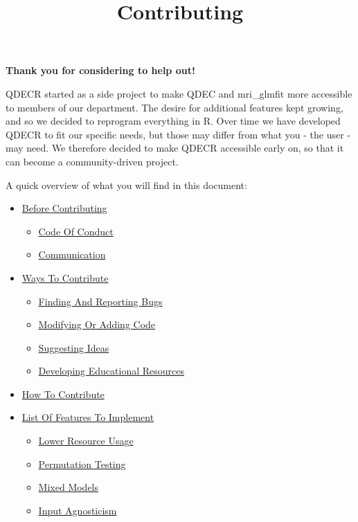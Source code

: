 \documentclass[]{article}
\title{Contributing}
\author{}
\date{}
\providecommand{\tightlist}{%
  \setlength{\itemsep}{0pt}\setlength{\parskip}{0pt}}
\begin{document}
\maketitle

\textbf{Thank you for considering to help out!}

QDECR started as a side project to make QDEC and mri\_glmfit more
accessible to members of our department. The desire for additional
features kept growing, and so we decided to reprogram everything in R.
Over time we have developed QDECR to fit our specific needs, but those
may differ from what you - the user - may need. We therefore decided to
make QDECR accessible early on, so that it can become a community-driven
project.

A quick overview of what you will find in this document:

\begin{itemize}
\tightlist
\item
  \protect\hyperlink{before-contributing}{Before Contributing}

  \begin{itemize}
  \tightlist
  \item
    \protect\hyperlink{code-of-conduct}{Code Of Conduct}
  \item
    \protect\hyperlink{communication}{Communication}
  \end{itemize}
\item
  \protect\hyperlink{ways-to-contribute}{Ways To Contribute}

  \begin{itemize}
  \tightlist
  \item
    \protect\hyperlink{finding-and-reporting-bugs}{Finding And Reporting
    Bugs}
  \item
    \protect\hyperlink{modifying-or-adding-code}{Modifying Or Adding
    Code}
  \item
    \protect\hyperlink{suggesting-ideas}{Suggesting Ideas}
  \item
    \protect\hyperlink{developing-educationalux5cux2520resources}{Developing
    Educational Resources}
  \end{itemize}
\item
  \protect\hyperlink{how-to-contribute}{How To Contribute}
\item
  \protect\hyperlink{list-of-features-to-implement}{List Of Features To
  Implement}

  \begin{itemize}
  \tightlist
  \item
    \protect\hyperlink{lower-resource-usage}{Lower Resource Usage}
  \item
    \protect\hyperlink{permutation-testing}{Permutation Testing}
  \item
    \protect\hyperlink{mixed-models}{Mixed Models}
  \item
    \protect\hyperlink{input-agnosticism}{Input Agnosticism}
  \end{itemize}
\end{itemize}
\end{document}
